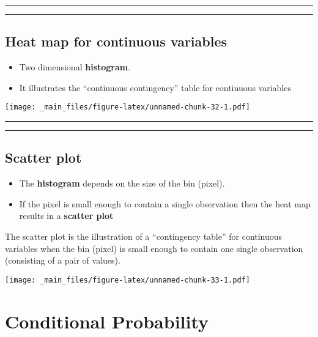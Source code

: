 \documentclass[
]{book}
\begin{document}
\begin{center}\rule{0.5\linewidth}{0.5pt}\end{center}

\begin{center}\rule{0.5\linewidth}{0.5pt}\end{center}

\hypertarget{heat-map-for-continuous-variables}{%
\section{Heat map for continuous variables}\label{heat-map-for-continuous-variables}}

\begin{itemize}
\item
  Two dimensional \textbf{histogram}.
\item
  It illustrates the ``continuous contingency'' table for continuous variables
\end{itemize}

\texttt{[image: \_main\_files/figure-latex/unnamed-chunk-32-1.pdf]}

\begin{center}\rule{0.5\linewidth}{0.5pt}\end{center}

\begin{center}\rule{0.5\linewidth}{0.5pt}\end{center}

\hypertarget{scatter-plot}{%
\section{Scatter plot}\label{scatter-plot}}

\begin{itemize}
\item
  The \textbf{histogram} depends on the size of the bin (pixel).
\item
  If the pixel is small enough to contain a single observation then the heat map results in a \textbf{scatter plot}
\end{itemize}

The scatter plot is the illustration of a ``contingency table'' for continuous variables when the bin (pixel) is small enough to contain one single observation (consisting of a pair of values).

\texttt{[image: \_main\_files/figure-latex/unnamed-chunk-33-1.pdf]}

\hypertarget{conditional-probability}{%
\chapter{Conditional Probability}\label{conditional-probability}}
\end{document}
